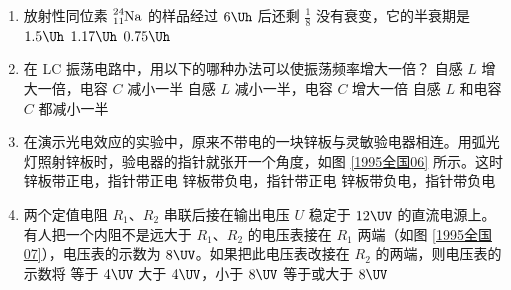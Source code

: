 \documentclass[\gkver]{gaokaozhenti}
\begin{document}
\begin{enumerate}
\item
放射性同位素 $\ce{^{24}_{11}Na}$ 的样品经过 $6\Uh$ 后还剩 $\frac{1}{8}$ 没有衰变，它的半衰期是
\fourchoices[answer=A]
{$2\Uh$}
{$1.5\Uh$}
{$1.17\Uh$}
{$0.75\Uh$}


\item
在 LC 振荡电路中，用以下的哪种办法可以使振荡频率增大一倍？
{自感 $L$ 增大一倍，电容 $C$ 减小一半}
{自感 $L$ 减小一半，电容 $C$ 增大一倍}
{自感 $L$ 和电容 $C$ 都减小一半}


\item
在演示光电效应的实验中，原来不带电的一块锌板与灵敏验电器相连。用弧光灯照射锌板时，验电器的指针就张开一个角度，如图 \ref{1995全国06} 所示。这时
\onepicture[num=6, showlabel=false, label=1995全国06, w=7.00cm]{}
{锌板带正电，指针带正电}
{锌板带负电，指针带正电}
{锌板带负电，指针带负电}


\item
两个定值电阻 $R_{1}$、$R_{2}$ 串联后接在输出电压 $U$ 稳定于 $12\UV$ 的直流电源上。有人把一个内阻不是远大于 $R_{1}$、$R_{2}$ 的电压表接在 $R_{1}$ 两端（如图 \ref{1995全国07}），电压表的示数为 $8\UV$。如果把此电压表改接在 $R_{2}$ 的两端，则电压表的示数将
{等于 $4\UV$}
{大于 $4\UV$，小于 $8\UV$}
{等于或大于 $8\UV$}


\end{enumerate}
\end{document}
